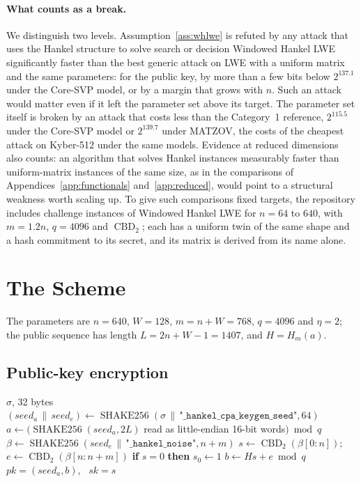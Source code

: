 \documentclass[11pt,a4paper]{article}
\theoremstyle{definition}
\newcommand{\CBD}{\operatorname{CBD}}
\newcommand{\SHAKE}{\operatorname{SHAKE256}}
\begin{document}
\paragraph{What counts as a break.} We distinguish two levels. Assumption~\ref{ass:whlwe} is refuted by any attack that uses the Hankel structure to solve search or decision Windowed Hankel LWE significantly faster than the best generic attack on LWE with a uniform matrix and the same parameters: for the public key, by more than a few bits below $2^{137.1}$ under the Core-SVP model, or by a margin that grows with $n$. Such an attack would matter even if it left the parameter set above its target. The parameter set itself is broken by an attack that costs less than the Category~1 reference, $2^{115.5}$ under the Core-SVP model or $2^{139.7}$ under MATZOV, the costs of the cheapest attack on Kyber-512 under the same models. Evidence at reduced dimensions also counts: an algorithm that solves Hankel instances measurably faster than uniform-matrix instances of the same size, as in the comparisons of Appendices~\ref{app:functionals} and~\ref{app:reduced}, would point to a structural weakness worth scaling up. To give such comparisons fixed targets, the repository includes challenge instances of Windowed Hankel LWE for $n = 64$ to $640$, with $m = 1.2n$, $q = 4096$ and $\CBD_2$; each has a uniform twin of the same shape and a hash commitment to its secret, and its matrix is derived from its name alone.

\FloatBarrier
\section{The Scheme}\label{sec:scheme}

The parameters are $n = 640$, $W = 128$, $m = n + W = 768$, $q = 4096$ and $\eta = 2$; the public sequence has length $L = 2n + W - 1 = 1407$, and $H = H_m(a)$.

\subsection{Public-key encryption}
\begin{algorithm}[H]
\caption{$\mathsf{CPA.KeyGen}(\sigma)$}\label{alg:cpa_keygen}
\begin{algorithmic}[1]
\Require $\sigma$, 32 bytes
\State $(\mathit{seed}_a \,\|\, \mathit{seed}_e) \gets \SHAKE(\sigma \,\|\, \texttt{"\_hankel\_cpa\_keygen\_seed"}, 64)$
\State $a \gets (\SHAKE(\mathit{seed}_a, 2L)$ read as little-endian 16-bit words$) \bmod q$
\State $\beta \gets \SHAKE(\mathit{seed}_e \,\|\, \texttt{"\_hankel\_noise"}, n + m)$
\State $s \gets \CBD_2(\beta[0{:}n])$; \ $e \gets \CBD_2(\beta[n{:}n+m])$
\State \textbf{if} $s = 0$ \textbf{then} $s_0 \gets 1$ 
\State $b \gets H s + e \bmod q$
\State \Return $\mathit{pk} = (\mathit{seed}_a, b)$, \ $\mathit{sk} = s$
\end{algorithmic}
\end{algorithm}
\end{document}
